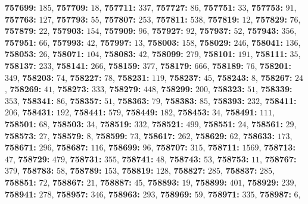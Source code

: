 \textsf{\bfseries 757699:} $185$, \textsf{\bfseries 757709:} $18$, \textsf{\bfseries 757711:} $337$, \textsf{\bfseries 757727:} $86$, \textsf{\bfseries 757751:} $33$, \textsf{\bfseries 757753:} $91$, \textsf{\bfseries 757763:} $127$, \textsf{\bfseries 757793:} $55$, \textsf{\bfseries 757807:} $253$, \textsf{\bfseries 757811:} $538$, \textsf{\bfseries 757819:} $12$, \textsf{\bfseries 757829:} $76$, \textsf{\bfseries 757879:} $22$, \textsf{\bfseries 757903:} $154$, \textsf{\bfseries 757909:} $96$, \textsf{\bfseries 757927:} $92$, \textsf{\bfseries 757937:} $52$, \textsf{\bfseries 757943:} $356$, \textsf{\bfseries 757951:} $66$, \textsf{\bfseries 757993:} $42$, \textsf{\bfseries 757997:} $13$, \textsf{\bfseries 758003:} $158$, \textsf{\bfseries 758029:} $246$, \textsf{\bfseries 758041:} $136$, \textsf{\bfseries 758053:} $26$, \textsf{\bfseries 758071:} $104$, \textsf{\bfseries 758083:} $42$, \textsf{\bfseries 758099:} $279$, \textsf{\bfseries 758101:} $191$, \textsf{\bfseries 758111:} $35$, \textsf{\bfseries 758137:} $233$, \textsf{\bfseries 758141:} $266$, \textsf{\bfseries 758159:} $377$, \textsf{\bfseries 758179:} $666$, \textsf{\bfseries 758189:} $76$, \textsf{\bfseries 758201:} $349$, \textsf{\bfseries 758203:} $74$, \textsf{\bfseries 758227:} $78$, \textsf{\bfseries 758231:} $119$, \textsf{\bfseries 758237:} $45$, \textsf{\bfseries 758243:} $8$, \textsf{\bfseries 758267:} $24$, \textsf{\bfseries 758269:} $41$, \textsf{\bfseries 758273:} $333$, \textsf{\bfseries 758279:} $448$, \textsf{\bfseries 758299:} $200$, \textsf{\bfseries 758323:} $51$, \textsf{\bfseries 758339:} $353$, \textsf{\bfseries 758341:} $86$, \textsf{\bfseries 758357:} $51$, \textsf{\bfseries 758363:} $79$, \textsf{\bfseries 758383:} $85$, \textsf{\bfseries 758393:} $232$, \textsf{\bfseries 758411:} $206$, \textsf{\bfseries 758431:} $192$, \textsf{\bfseries 758441:} $579$, \textsf{\bfseries 758449:} $182$, \textsf{\bfseries 758453:} $34$, \textsf{\bfseries 758491:} $111$, \textsf{\bfseries 758501:} $68$, \textsf{\bfseries 758503:} $34$, \textsf{\bfseries 758519:} $332$, \textsf{\bfseries 758521:} $499$, \textsf{\bfseries 758551:} $24$, \textsf{\bfseries 758561:} $29$, \textsf{\bfseries 758573:} $27$, \textsf{\bfseries 758579:} $8$, \textsf{\bfseries 758599:} $73$, \textsf{\bfseries 758617:} $262$, \textsf{\bfseries 758629:} $62$, \textsf{\bfseries 758633:} $173$, \textsf{\bfseries 758671:} $296$, \textsf{\bfseries 758687:} $116$, \textsf{\bfseries 758699:} $96$, \textsf{\bfseries 758707:} $315$, \textsf{\bfseries 758711:} $1569$, \textsf{\bfseries 758713:} $47$, \textsf{\bfseries 758729:} $479$, \textsf{\bfseries 758731:} $355$, \textsf{\bfseries 758741:} $48$, \textsf{\bfseries 758743:} $53$, \textsf{\bfseries 758753:} $11$, \textsf{\bfseries 758767:} $379$, \textsf{\bfseries 758783:} $58$, \textsf{\bfseries 758789:} $153$, \textsf{\bfseries 758819:} $128$, \textsf{\bfseries 758827:} $285$, \textsf{\bfseries 758837:} $285$, \textsf{\bfseries 758851:} $72$, \textsf{\bfseries 758867:} $21$, \textsf{\bfseries 758887:} $45$, \textsf{\bfseries 758893:} $19$, \textsf{\bfseries 758899:} $401$, \textsf{\bfseries 758929:} $239$, \textsf{\bfseries 758941:} $278$, \textsf{\bfseries 758957:} $346$, \textsf{\bfseries 758963:} $293$, \textsf{\bfseries 758969:} $59$, \textsf{\bfseries 758971:} $335$, \textsf{\bfseries 758987:} $6$, 

